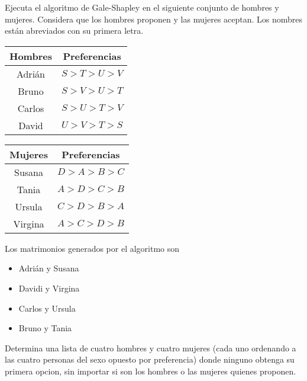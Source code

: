 \documentclass[answers,11pt]{exam}
\begin{document}
\begin{questions}
\question Ejecuta el algoritmo de Gale-Shapley en el siguiente conjunto de hombres y mujeres. Considera que los hombres proponen y las mujeres aceptan. Los nombres est\'an abreviados con su primera letra. \\

\begin{center}
\begin{tabular}{|c|c|}
\hline
Hombres & Preferencias \\ 
\hline 
Adri\'an & $S > T > U > V$ \\
Bruno & $S > V > U > T $ \\
Carlos & $S > U > T > V$ \\
David & $ U > V > T > S$ \\
\hline
\end{tabular}
\hspace{2cm}
\begin{tabular}{|c|c|}
\hline
Mujeres & Preferencias \\
\hline
Susana & $D > A > B > C$ \\
Tania & $A > D > C > B $ \\
Ursula & $C>D>B>A $ \\ 
Virgina & $A>C>D>B$ \\
\hline
\end{tabular}
\end{center}

Los matrimonios generados por el algoritmo son

\begin{itemize}
    \item Adrián y Susana
    \item Davidi y Virgina
    \item Carlos y Ursula
    \item Bruno y Tania
\end{itemize}

\question Determina una lista de cuatro hombres y cuatro mujeres (cada uno ordenando a las cuatro personas del sexo opuesto por preferencia) donde ninguno obtenga su primera opcion, sin importar si son los hombres o las mujeres quienes proponen.


\end{questions}
\end{document}
